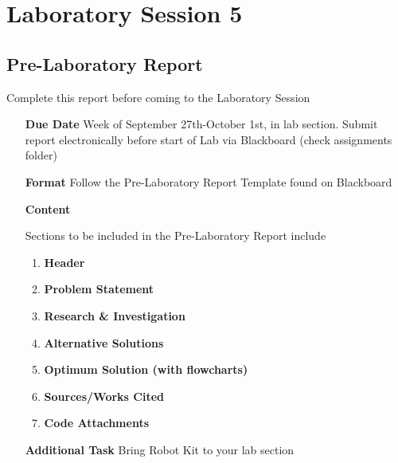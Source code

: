 \chapter{Laboratory Session 5}
\section{Pre-Laboratory Report}
	Complete this report before coming to the Laboratory Session
\begin{itemize}
	\item[\textbf{Due Date}]{Week of September 27th-October 1st, \the\year \space in lab section. Submit report electronically before start of Lab via Blackboard (check assignments folder)}
	\item[\textbf{Format}]{Follow the Pre-Laboratory Report Template found on Blackboard}
	\item[\textbf{Content}]{Sections to be included in the Pre-Laboratory Report include
		\begin{enumerate}
			\item \textbf{Header}
			\item \textbf{Problem Statement}
			\item \textbf{Research \& Investigation}
			\item \textbf{Alternative Solutions}
			\item \textbf{Optimum Solution (with flowcharts)}
			\item \textbf{Sources/Works Cited}
			\item \textbf{Code Attachments}
		\end{enumerate}
		
	}
	\item[\textbf{Additional Task}]{Bring Robot Kit to your lab section}
\end{itemize}
